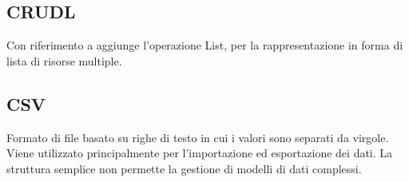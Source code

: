 \vspace{2em}
\subsection*{CRUDL}
\par Con riferimento a  aggiunge l'operazione List, per la rappresentazione in forma di lista di risorse multiple.

\vspace{2em}
\subsection*{CSV}
Formato di file basato su righe di testo in cui i valori sono separati da virgole. Viene utilizzato principalmente per l'importazione ed esportazione dei dati. La struttura semplice non permette la gestione di modelli di dati complessi.
